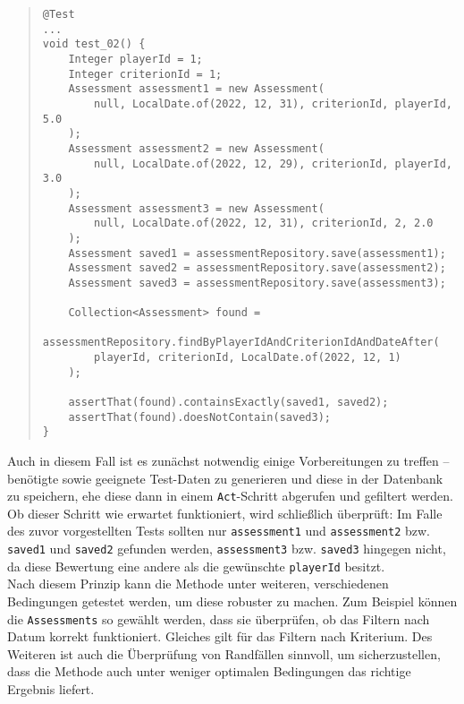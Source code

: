 \begin{quote}
\begin{verbatim}
@Test
...
void test_02() {
    Integer playerId = 1;
    Integer criterionId = 1;
    Assessment assessment1 = new Assessment(
        null, LocalDate.of(2022, 12, 31), criterionId, playerId, 5.0
    );
    Assessment assessment2 = new Assessment(
        null, LocalDate.of(2022, 12, 29), criterionId, playerId, 3.0
    );
    Assessment assessment3 = new Assessment(
        null, LocalDate.of(2022, 12, 31), criterionId, 2, 2.0
    );
    Assessment saved1 = assessmentRepository.save(assessment1);
    Assessment saved2 = assessmentRepository.save(assessment2);
    Assessment saved3 = assessmentRepository.save(assessment3);

    Collection<Assessment> found = 
        assessmentRepository.findByPlayerIdAndCriterionIdAndDateAfter(
        playerId, criterionId, LocalDate.of(2022, 12, 1)
    );

    assertThat(found).containsExactly(saved1, saved2);
    assertThat(found).doesNotContain(saved3);
}
\end{verbatim}
\end{quote}

Auch in diesem Fall ist es zunächst notwendig einige Vorbereitungen zu treffen -- 
benötigte sowie geeignete Test-Daten zu generieren und diese in der Datenbank zu 
speichern, ehe diese dann in einem \texttt{Act}-Schritt abgerufen und gefiltert 
werden. Ob dieser Schritt wie erwartet funktioniert, wird schließlich überprüft: Im 
Falle des zuvor vorgestellten Tests sollten nur \texttt{assessment1} und 
\texttt{assessment2} bzw. \texttt{saved1} und \texttt{saved2} gefunden werden, 
\texttt{assessment3} bzw. \texttt{saved3} hingegen nicht, da diese Bewertung eine 
andere als die gewünschte \texttt{playerId} besitzt. \\ 
Nach diesem Prinzip kann die Methode unter weiteren, verschiedenen Bedingungen 
getestet werden, um diese robuster zu machen. Zum Beispiel können die 
\texttt{Assessments} so gewählt werden, dass sie überprüfen, ob das Filtern nach 
Datum korrekt funktioniert. Gleiches gilt für das Filtern nach Kriterium. Des Weiteren 
ist auch die Überprüfung von Randfällen sinnvoll, um sicherzustellen, dass die 
Methode auch unter weniger optimalen Bedingungen das richtige Ergebnis liefert. 

